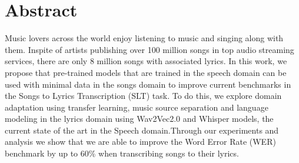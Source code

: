 \chapter*{\centering Abstract}


    Music lovers across the world enjoy listening to music and singing along with them. Inspite of artists publishing over 100 million songs in top audio streaming services, there are only 8 million songs with associated lyrics. In this work, we propose that pre-trained models that are trained in the speech domain can be used with minimal data in the songs domain to improve current benchmarks in the Songs to Lyrics Transcription (SLT) task. To do this, we explore domain adaptation using transfer learning, music source separation and language modeling in the lyrics domain using Wav2Vec2.0 and Whisper models, the current state of the art in the Speech domain.Through our experiments and analysis we show that we are able to improve the Word Error Rate (WER) benchmark by up to 60\% when transcribing songs to their lyrics.
